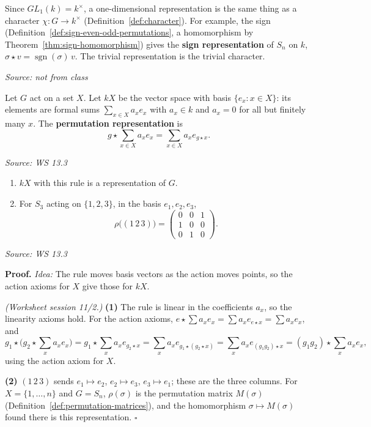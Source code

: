 \documentclass[11pt]{report}
\newcommand{\sgn}{\operatorname{sgn}}
\renewenvironment{proof}[1][Proof]{\noindent\textbf{#1.} }{\hfill$\square$\par\vspace{5pt}}
\newcommand{\srcline}[1]{\par\hfill{\footnotesize\textit{Source: #1}}}
\begin{document}
\begin{exbox}\label{ex:one-dimensional-representations}
Since $GL_1(k) = k^\times$, a one-dimensional representation is the same thing as a character $\chi: G \to k^\times$ (Definition~\ref{def:character}). For example, the sign (Definition~\ref{def:sign-even-odd-permutations}, a homomorphism by Theorem~\ref{thm:sign-homomorphism}) gives the \textbf{sign representation} of $S_n$ on $k$, $\sigma \star v = \sgn(\sigma)\,v$. The trivial representation is the trivial character.
\srcline{not from class}
\end{exbox}

\begin{defbox}\label{def:permutation-representation-g-set}
Let $G$ act on a set $X$. Let $kX$ be the vector space with basis $\{e_x : x \in X\}$: its elements are formal sums $\sum_{x \in X} a_x e_x$ with $a_x \in k$ and $a_x = 0$ for all but finitely many $x$. The \textbf{permutation representation} is
\[ g \star \sum_{x \in X} a_x e_x = \sum_{x \in X} a_x e_{g \star x}. \]
\srcline{WS 13.3}
\end{defbox}

\begin{propbox}\label{prop:permutation-representation-is-representation}
\begin{enumerate}
    \item $kX$ with this rule is a representation of $G$.
    \item For $S_3$ acting on $\{1, 2, 3\}$, in the basis $e_1, e_2, e_3$,
    \[ \rho\big((1\,2\,3)\big) = \begin{pmatrix} 0 & 0 & 1 \\ 1 & 0 & 0 \\ 0 & 1 & 0 \end{pmatrix}. \]
\end{enumerate}
\srcline{WS 13.3}
\end{propbox}

\begin{proof}
\textit{Idea:} The rule moves basis vectors as the action moves points, so the action axioms for $X$ give those for $kX$.\par
\textit{(Worksheet session 11/2.)} \textbf{(1)} The rule is linear in the coefficients $a_x$, so the linearity axioms hold. For the action axioms, $e \star \sum a_x e_x = \sum a_x e_{e \star x} = \sum a_x e_x$, and
\[ g_1 \star \Big(g_2 \star \sum_x a_x e_x\Big) = g_1 \star \sum_x a_x e_{g_2 \star x} = \sum_x a_x e_{g_1 \star (g_2 \star x)} = \sum_x a_x e_{(g_1g_2) \star x} = (g_1g_2) \star \sum_x a_x e_x, \]
using the action axiom for $X$.

\textbf{(2)} $(1\,2\,3)$ sends $e_1 \mapsto e_2$, $e_2 \mapsto e_3$, $e_3 \mapsto e_1$; these are the three columns. For $X = \{1, \ldots, n\}$ and $G = S_n$, $\rho(\sigma)$ is the permutation matrix $M(\sigma)$ (Definition~\ref{def:permutation-matrices}), and the homomorphism $\sigma \mapsto M(\sigma)$ found there is this representation.
\end{proof}
\end{document}
